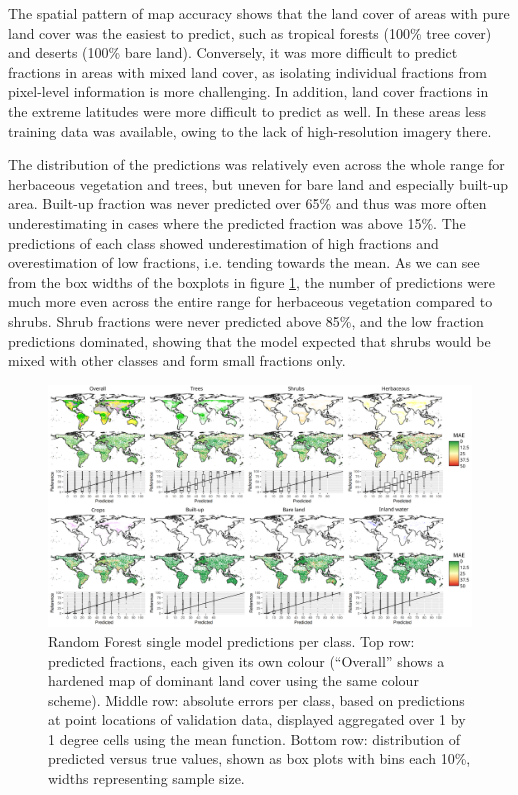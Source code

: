 \documentclass[review,authoryear,3p]{elsarticle}
\begin{document}
The spatial pattern of map accuracy shows that the land cover of areas with pure land cover was the easiest to predict, such as tropical forests (100\% tree cover) and deserts (100\% bare land).
Conversely, it was more difficult to predict fractions in areas with mixed land cover, as isolating individual fractions from pixel-level information is more challenging.
In addition, land cover fractions in the extreme latitudes were more difficult to predict as well.
In these areas less training data was available, owing to the lack of high-resolution imagery there.

The distribution of the predictions was relatively even across the whole range for herbaceous vegetation and trees, but uneven for bare land and especially built-up area.
Built-up fraction was never predicted over 65\% and thus was more often underestimating in cases where the predicted fraction was above 15\%.
The predictions of each class showed underestimation of high fractions and overestimation of low fractions, i.e. tending towards the mean.
As we can see from the box widths of the boxplots in figure \ref{fig-walltowall}, the number of predictions were much more even across the entire range for herbaceous vegetation compared to shrubs.
Shrub fractions were never predicted above 85\%, and the low fraction predictions dominated, showing that the model expected that shrubs would be mixed with other classes and form small fractions only.

\begin{figure}
    \centering
    \includegraphics[width=\textwidth]{article-figures/maps/2020-07-29-walltowall.png}
    \caption{Random Forest single model predictions per class. Top row: predicted fractions, each given its own colour (``Overall'' shows a hardened map of dominant land cover using the same colour scheme). Middle row: absolute errors per class, based on predictions at point locations of validation data, displayed aggregated over 1 by 1 degree cells using the mean function. Bottom row: distribution of predicted versus true values, shown as box plots with bins each 10\%, widths representing sample size.}
    \label{fig-walltowall}
\end{figure}
\end{document}
